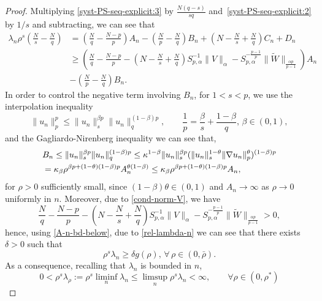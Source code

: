 \documentclass[11pt,reqno]{amsart}
\theoremstyle{definition}
\numberwithin{equation}{section}
\numberwithin{theorem}{section}
\numberwithin{equation}{section}
\numberwithin{theorem}{section}
\begin{document}
\begin{proof}
Multiplying \eqref{syst-PS-seq-explicit:3} by $\frac{N(q-s)}{sq}$ and~\eqref{syst-PS-seq-explicit:2} by $1/s$ and subtracting, we can see that
\begin{equation}\label{rel-lambda-n}
\begin{aligned}
\lambda_n\rho^s\left(\frac{N}{s}-\frac{N}{q}\right)&=\left(\frac{N}{q}-\frac{N-p}{p}\right)A_n -\left(\frac{N}{p}-\frac{N}{q}\right)B_n +\left(N-\frac{N}{s}+\frac{N}{q}\right)C_n +D_n \\
&\ge\left(\frac{N}{q}-\frac{N-p}{p}-\left(N-\frac{N}{s}+\frac{N}{q}\right)S_{p,\alpha}^{-1}\|V\|_{\alpha} - S_{p,\alpha}^{-\frac{p-1}{p}}\|\tilde{W}\|_{\frac{\alpha p}{p-1}}\right)A_n\\
&-\left(\frac{N}{p}-\frac{N}{q}\right)B_n .
\end{aligned}
\end{equation}
In order to control the negative term involving $B_n$, for $1<s<p$, we use the interpolation inequality $$\|u_n\|^p_p\le\|u_n\|_s^{\beta p}\|u_n\|_q^{(1-\beta)p},\qquad\frac{1}{p}=\frac{\beta}{s}+\frac{1-\beta}{q},\,\beta\in(0,1),$$
and the Gagliardo-Nirenberg inequality we can see that,
\begin{equation}\notag
\begin{aligned}
&B_n\le \|u_n\|_s^{\beta p}\|u_n\|_q^{(1-\beta)p}
\le \kappa^{1-\beta} \|u_n\|_s^{\beta p}(\|u_n\|_s^{1-\theta}\|\nabla u_n\|_p^\theta)^{(1-\beta)p}
\\
&=\kappa_{\beta}\rho^{\beta p+(1-\theta)(1-\beta)p}A_n^{\theta (1-\beta)}
\le \kappa_{\beta}\rho^{\beta p+(1-\theta)(1-\beta)p}A_n,   
\end{aligned}
\end{equation}
for $\rho>0$ sufficiently small, since $(1-\beta)\theta\in(0,1)$ and $A_n\to\infty$ %
as $\rho\to 0$ uniformly in $n$. Moreover, due to \eqref{cond-norm-V}, we have 
$$\frac{N}{q}-\frac{N-p}{p}-\left(N-\frac{N}{s}+\frac{N}{q}\right)S_{p,\alpha}^{-1}\|V\|_{\alpha} - S_{p,\alpha}^{-\frac{p-1}{p}}\|\tilde{W}\|_{\frac{\alpha p}{p-1}}>0,$$
hence, using \eqref{A-n-bd-below}, due to \eqref{rel-lambda-n} we can see that there exists $\delta>0$ such that 
\begin{equation}
\rho^s\lambda_n\ge \delta g(\rho),\,\forall\,\rho\in(0,\bar{\rho}).
\end{equation}
As a consequence, recalling that $\lambda_n$ is bounded in $n$,
\begin{equation}\label{lim:lag:mult}
0<\rho^s\lambda_{\rho}:=\rho^s\liminf_n \lambda_n\le \limsup_n \rho^s\lambda_n<\infty,\qquad\forall \rho\in(0,\rho^*)    

\end{equation}
\end{proof}
\end{document}
